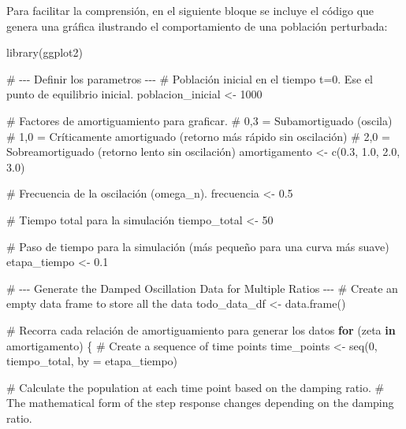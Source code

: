 \documentclass[
  12pt,
  letterpaper,
]{book}
\newenvironment{Shaded}{\begin{snugshade}}{\end{snugshade}}
\newcommand{\AttributeTok}[1]{\textcolor[rgb]{0.40,0.45,0.13}{#1}}
\newcommand{\CommentTok}[1]{\textcolor[rgb]{0.37,0.37,0.37}{#1}}
\newcommand{\ControlFlowTok}[1]{\textcolor[rgb]{0.00,0.23,0.31}{\textbf{#1}}}
\newcommand{\DecValTok}[1]{\textcolor[rgb]{0.68,0.00,0.00}{#1}}
\newcommand{\FloatTok}[1]{\textcolor[rgb]{0.68,0.00,0.00}{#1}}
\newcommand{\FunctionTok}[1]{\textcolor[rgb]{0.28,0.35,0.67}{#1}}
\newcommand{\NormalTok}[1]{\textcolor[rgb]{0.00,0.23,0.31}{#1}}
\newcommand{\OtherTok}[1]{\textcolor[rgb]{0.00,0.23,0.31}{#1}}
\begin{document}
Para facilitar la comprensión, en el siguiente bloque se incluye el
código que genera una gráfica ilustrando el comportamiento de una
población perturbada:

\begin{Shaded}
\begin{Highlighting}[]
\FunctionTok{library}\NormalTok{(ggplot2)}

\CommentTok{\# {-}{-}{-} Definir los parametros {-}{-}{-}}
\CommentTok{\# Población inicial en el tiempo t=0. Ese el punto de equilibrio inicial.}
\NormalTok{poblacion\_inicial }\OtherTok{\textless{}{-}} \DecValTok{1000}

\CommentTok{\# Factores de amortiguamiento para graficar.}
\CommentTok{\# 0,3 = Subamortiguado (oscila)}
\CommentTok{\# 1,0 = Críticamente amortiguado (retorno más rápido sin oscilación)}
\CommentTok{\# 2,0 = Sobreamortiguado (retorno lento sin oscilación)}
\NormalTok{amortigamento }\OtherTok{\textless{}{-}} \FunctionTok{c}\NormalTok{(}\FloatTok{0.3}\NormalTok{, }\FloatTok{1.0}\NormalTok{, }\FloatTok{2.0}\NormalTok{, }\FloatTok{3.0}\NormalTok{)}

\CommentTok{\# Frecuencia de la oscilación (omega\_n).}
\NormalTok{frecuencia }\OtherTok{\textless{}{-}} \FloatTok{0.5}

\CommentTok{\# Tiempo total para la simulación}
\NormalTok{tiempo\_total }\OtherTok{\textless{}{-}} \DecValTok{50}

\CommentTok{\# Paso de tiempo para la simulación (más pequeño para una curva más suave)}
\NormalTok{etapa\_tiempo }\OtherTok{\textless{}{-}} \FloatTok{0.1}

\CommentTok{\# {-}{-}{-} Generate the Damped Oscillation Data for Multiple Ratios {-}{-}{-}}
\CommentTok{\# Create an empty data frame to store all the data}
\NormalTok{todo\_data\_df }\OtherTok{\textless{}{-}} \FunctionTok{data.frame}\NormalTok{()}

\CommentTok{\# Recorra cada relación de amortiguamiento para generar los datos}
\ControlFlowTok{for}\NormalTok{ (zeta }\ControlFlowTok{in}\NormalTok{ amortigamento) \{}
  \CommentTok{\# Create a sequence of time points}
\NormalTok{  time\_points }\OtherTok{\textless{}{-}} \FunctionTok{seq}\NormalTok{(}\DecValTok{0}\NormalTok{, tiempo\_total, }\AttributeTok{by =}\NormalTok{ etapa\_tiempo)}

  \CommentTok{\# Calculate the population at each time point based on the damping ratio.}
  \CommentTok{\# The mathematical form of the step response changes depending on the damping ratio.}


\end{Highlighting}
\end{Shaded}
\end{document}
